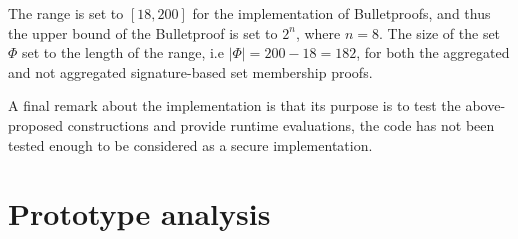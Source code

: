 The range is set to $[18,200]$ for the implementation of Bulletproofs, and thus the upper bound of the Bulletproof is set to $2^n$, where $n=8$. The size of the set $\Phi$ set to the length of the range, i.e $|\Phi|=200-18 = 182$, for both the aggregated and not aggregated signature-based set membership proofs. 

A final remark about the implementation is that its purpose is to test the above-proposed constructions and provide runtime evaluations, the code has not been tested enough to be considered as a secure implementation.




\section{Prototype analysis}


